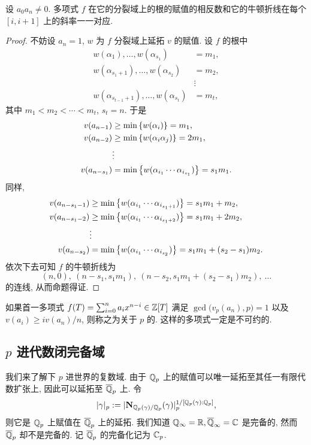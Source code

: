 \begin{proposition}{}{}
设 $a_0a_n\neq0$. 多项式 $f$ 在它的分裂域上的根的赋值的相反数和它的牛顿折线在每个 $[i,i+1]$ 上的斜率一一对应.
\end{proposition}
\begin{proof}
不妨设 $a_n=1$, $w$ 为 $f$ 分裂域上延拓 $v$ 的赋值. 设 $f$ 的根中
	\[\begin{split}
		w(\alpha_1),\dots,w(\alpha_{s_1})&=m_1,\\
		w(\alpha_{s_1+1}),\dots,w(\alpha_{s_2})&=m_2,\\
		&\vdots\\
		w(\alpha_{s_{t-1}+1}),\dots,w(\alpha_{s_t})&=m_t,
	\end{split}\]
其中 $m_1<m_2<\cdots<m_t$, $s_t=n$. 于是
	\[\begin{split}
	v(a_{n-1})&\ge\min\left\{w(\alpha_i)\right\}=m_1,\\
	v(a_{n-2})&\ge\min\left\{w(\alpha_i \alpha_j)\right\}=2m_1,\\
	&\vdots\\
	v(a_{n-s_1})&=\min\left\{w(\alpha_{i_1}\cdots \alpha_{i_{s_1}})\right\}=s_1m_1.
	\end{split}\]
同样,
	\[\begin{split}
	v(a_{n-s_1-1})&\ge\min\left\{w(\alpha_{i_1}\cdots \alpha_{i_{s_1+1}})\right\}=s_1m_1+m_2,\\
	v(a_{n-s_1-2})&\ge\min\left\{w(\alpha_{i_1}\cdots \alpha_{i_{s_1+2}})\right\}=s_1m_1+2m_2,\\
	&\vdots\\
	v(a_{n-s_2})&=\min\left\{w(\alpha_{i_1}\cdots \alpha_{i_{s_2}})\right\}=s_1m_1+(s_2-s_1)m_2.
	\end{split}\]
依次下去可知 $f$ 的牛顿折线为
	\[(n,0),\ (n-s_1,s_1m_1),\ (n-s_2,s_1m_1+(s_2-s_1)m_2),\ \dots\]
的连线, 从而命题得证.
\end{proof}

\begin{exercise}
如果首一多项式 $f(T)=\sum_{i=0}^n a_ix^{n-i}\in {\mathbb{Z}}[T]$ 满足 $\gcd\bigl(v_p(a_n),p\bigr)=1$ 以及 $v(a_i)\ge i v(a_n)/n$, 则称之为关于 $p$ 的. 这样的多项式一定是不可约的.
\end{exercise}


\subsection{\texorpdfstring{$p$}{p} 进代数闭完备域}
我们来了解下 $p$ 进世界的复数域. 由于 ${\mathbb{Q}}_p$ 上的赋值可以唯一延拓至其任一有限代数扩张上, 因此可以延拓至 $\overline{{\mathbb{Q}}}_p$ 上.
令
  \[|\gamma|_p:=|{\mathbf{N}}_{{\mathbb{Q}}_p(\gamma)/{\mathbb{Q}}_p}(\gamma)|_p^{1/[{\mathbb{Q}}_p(\gamma):{\mathbb{Q}}_p]},\]
则它是 ${\mathbb{Q}}_p$ 上赋值在 $\overline{{\mathbb{Q}}}_p$ 上的延拓. 我们知道 ${\mathbb{Q}}_\infty={\mathbb{R}},\overline{{\mathbb{Q}}}_\infty={\mathbb{C}}$ 是完备的, 然而 $\overline{{\mathbb{Q}}}_p$ 却不是完备的. 记 $\overline{{\mathbb{Q}}}_p$ 的完备化记为 ${\mathbb{C}}_p$.

